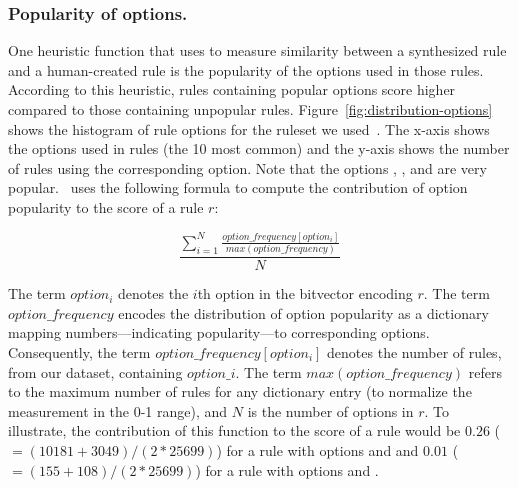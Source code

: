 \documentclass[sigconf,review, anonymous]{acmart}
\begin{document}

\subsubsection{Popularity of options.}
One heuristic function that \tname{} uses to measure similarity
between a synthesized rule and a human-created rule is the popularity
of the options used in those rules. According to this heuristic, rules
containing popular options score higher compared to those containing
unpopular rules. Figure~\ref{fig:distribution-options} shows the
histogram of rule options for the ruleset we
used~\cite{emerging-threats-open}. The x-axis shows the options used
in rules (the 10 most common) and the y-axis shows the number of rules
using the corresponding option. Note that the options
, , and  are very
popular. \tname\ uses the following formula to compute the
contribution of option popularity to the score of a rule $r$:

\vspace{-2ex}
\[\frac{\sum_{i=1}^{N}\frac{\mathit{option\_frequency[option_i]}}{\mathit{max(option\_frequency)}}}{N}\]
\vspace{-2ex}

\noindent
The term $\mathit{option_i}$ denotes the $i$th option in the bitvector
encoding $r$. The term $\mathit{option\_frequency}$ encodes the
distribution of option popularity as a dictionary mapping
numbers---indicating popularity---to corresponding
options. Consequently, the term $\mathit{option\_frequency[option_i]}$
denotes the number of rules, from our dataset, containing
$\mathit{option\_i}$. The term $\mathit{max(option\_frequency)}$
refers to the maximum number of rules for any dictionary entry (to
normalize the measurement in the 0-1 range), and $N$ is the number of
options in $r$. To illustrate, the contribution of this function to
the score of a rule would be $0.26$ ($=(10181+3049)/(2*25699)$) for a
rule with options  and  and $0.01$
($=(155+108)/(2*25699)$) for a rule with options  and
.

\end{document}
